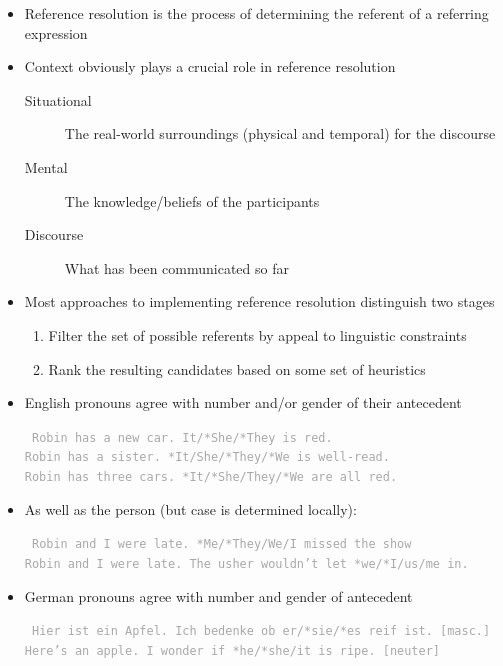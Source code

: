 \documentclass[landscape]{jhuslides3C}
\begin{document}
\vfill
\begin{itemize}
\item Reference resolution is the process of determining the referent of a referring expression
\item Context obviously plays a crucial role in reference resolution
\begin{description}
\item[Situational]
The real-world surroundings (physical and temporal) for the discourse
\item[Mental]
The knowledge/beliefs of the participants
\item[Discourse]
What has been communicated so far\pause
\end{description}
\item Most approaches to implementing reference resolution distinguish two stages
\begin{enumerate}
\item Filter the set of possible referents by appeal to linguistic constraints
\item Rank the resulting candidates based on some set of heuristics
\end{enumerate}
\end{itemize}
\vfill


\vfill
\begin{itemize}
\item English pronouns agree with number and/or gender of their antecedent
\textcolor{darkgrey}{\begin{flushleft} \tt \vspace{-5mm}
Robin has a new car. It/*She/*They is red.\\
Robin has a sister. *It/She/*They/*We is well-read.\\
Robin has three cars. *It/*She/They/*We are all red.\pause
\end{flushleft}}
\item As well as the person (but case is determined locally):
\textcolor{darkgrey}{\begin{flushleft} \tt \vspace{-5mm}
Robin and I were late. *Me/*They/We/I missed the show\\
Robin and I were late. The usher wouldn't let *we/*I/us/me in.\pause
\end{flushleft}}
\item German pronouns agree with number and gender of antecedent
\textcolor{darkgrey}{\begin{flushleft} \tt \vspace{-5mm}
Hier ist ein Apfel. Ich bedenke ob er/*sie/*es reif ist. [masc.]\\
Here's an apple. I wonder if *he/*she/it is ripe. [neuter]
\end{flushleft}}
\end{itemize}
\vfill
\end{document}
